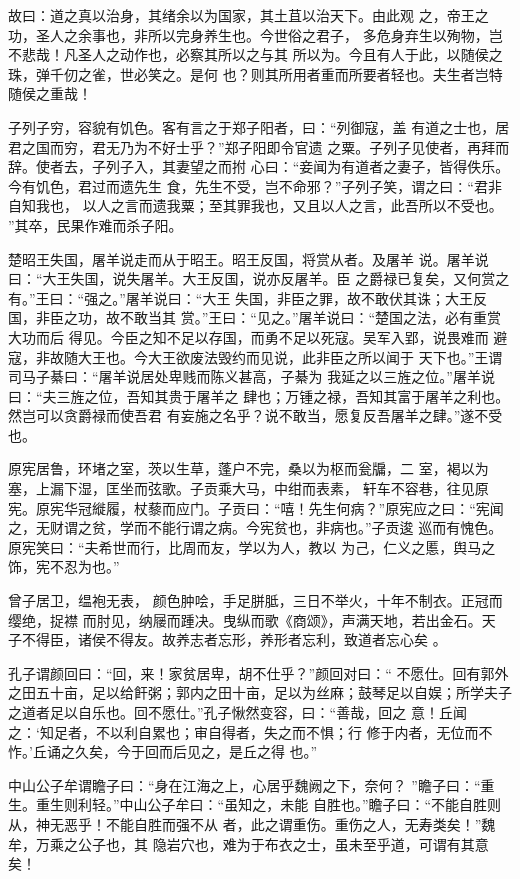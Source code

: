 \documentclass[12pt,UTF8]{ctexbook}
\begin{document}
故曰：道之真以治身，其绪余以为国家，其土苴以治天下。由此观 之，帝王之功，圣人之余事也，非所以完身养生也。今世俗之君子， 多危身弃生以殉物，岂不悲哉！凡圣人之动作也，必察其所以之与其 所以为。今且有人于此，以随侯之珠，弹千仞之雀，世必笑之。是何 也？则其所用者重而所要者轻也。夫生者岂特随侯之重哉！

子列子穷，容貌有饥色。客有言之于郑子阳者，曰：“列御寇，盖 有道之士也，居君之国而穷，君无乃为不好士乎？”郑子阳即令官遗 之粟。子列子见使者，再拜而辞。使者去，子列子入，其妻望之而拊 心曰：“妾闻为有道者之妻子，皆得佚乐。今有饥色，君过而遗先生 食，先生不受，岂不命邪？”子列子笑，谓之曰∶“君非自知我也， 以人之言而遗我粟；至其罪我也，又且以人之言，此吾所以不受也。 ”其卒，民果作难而杀子阳。

楚昭王失国，屠羊说走而从于昭王。昭王反国，将赏从者。及屠羊 说。屠羊说曰：“大王失国，说失屠羊。大王反国，说亦反屠羊。臣 之爵禄已复矣，又何赏之有。”王曰：“强之。”屠羊说曰：“大王 失国，非臣之罪，故不敢伏其诛；大王反国，非臣之功，故不敢当其 赏。”王曰：“见之。”屠羊说曰：“楚国之法，必有重赏大功而后 得见。今臣之知不足以存国，而勇不足以死寇。吴军入郢，说畏难而 避寇，非故随大王也。今大王欲废法毁约而见说，此非臣之所以闻于 天下也。”王谓司马子綦曰：“屠羊说居处卑贱而陈义甚高，子綦为 我延之以三旌之位。”屠羊说曰：“夫三旌之位，吾知其贵于屠羊之 肆也；万锺之禄，吾知其富于屠羊之利也。然岂可以贪爵禄而使吾君 有妄施之名乎？说不敢当，愿复反吾屠羊之肆。”遂不受也。

原宪居鲁，环堵之室，茨以生草，蓬户不完，桑以为枢而瓮牖，二 室，褐以为塞，上漏下湿，匡坐而弦歌。子贡乘大马，中绀而表素， 轩车不容巷，往见原宪。原宪华冠縰履，杖藜而应门。子贡曰：“嘻！先生何病？”原宪应之曰：“宪闻 之，无财谓之贫，学而不能行谓之病。今宪贫也，非病也。”子贡逡 巡而有愧色。原宪笑曰：“夫希世而行，比周而友，学以为人，教以 为己，仁义之慝，舆马之饰，宪不忍为也。”

曾子居卫，缊袍无表， 颜色肿哙，手足胼胝，三日不举火，十年不制衣。正冠而缨绝，捉襟 而肘见，纳屦而踵决。曳纵而歌《商颂》，声满天地，若出金石。天 子不得臣，诸侯不得友。故养志者忘形，养形者忘利，致道者忘心矣 。

孔子谓颜回曰：“回，来！家贫居卑，胡不仕乎？”颜回对曰：“ 不愿仕。回有郭外之田五十亩，足以给飦粥；郭内之田十亩，足以为丝麻；鼓琴足以自娱；所学夫子 之道者足以自乐也。回不愿仕。”孔子愀然变容，曰：“善哉，回之 意！丘闻之：‘知足者，不以利自累也；审自得者，失之而不惧；行 修于内者，无位而不怍。’丘诵之久矣，今于回而后见之，是丘之得 也。”

中山公子牟谓瞻子曰：“身在江海之上，心居乎魏阙之下，奈何？ ”瞻子曰：“重生。重生则利轻。”中山公子牟曰：“虽知之，未能 自胜也。”瞻子曰：“不能自胜则从，神无恶乎！不能自胜而强不从 者，此之谓重伤。重伤之人，无寿类矣！”魏牟，万乘之公子也，其 隐岩穴也，难为于布衣之士，虽未至乎道，可谓有其意矣！
\end{document}
